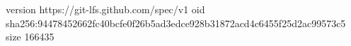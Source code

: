 version https://git-lfs.github.com/spec/v1
oid sha256:94478452662fc40bcfe0f26b5ad3edce928b31872acd4c6455f25d2ac99573c5
size 166435
